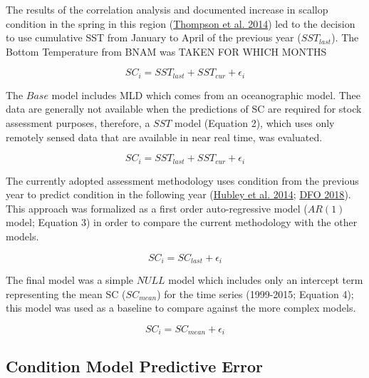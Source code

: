 \documentclass[
]{article}
\begin{document}
The results of the correlation analysis and documented increase in scallop condition in the spring in this region (\protect\hyperlink{ref-thompsonIdentifyingSpawningEvents2014}{Thompson et al. 2014}) led to the decision to use cumulative SST from January to April of the previous year (\(SST_{last}\)). The Bottom Temperature from BNAM was TAKEN FOR WHICH MONTHS

\begin{equation}  SC_{i} = SST_{last} + SST_{cur} + \epsilon_i    \end{equation}

The \(Base\) model includes MLD which comes from an oceanographic model. Thee data are generally not available when the predictions of SC are required for stock assessment purposes, therefore, a \(SST\) model (Equation 2), which uses only remotely sensed data that are available in near real time, was evaluated.

\begin{equation}  SC_{i} = SST_{last} + SST_{cur} + \epsilon_i    \end{equation}

The currently adopted assessment methodology uses condition from the previous year to predict condition in the following year (\protect\hyperlink{ref-hubleyGeorgesBankBrowns2014}{Hubley et al. 2014}; \protect\hyperlink{ref-dfoStockStatusUpdate2018}{DFO 2018}). This approach was formalized as a first order auto-regressive model (\(AR(1)\) model; Equation 3) in order to compare the current methodology with the other models.

\begin{equation} SC_{i} = SC_{last} + \epsilon_i    \end{equation}

The final model was a simple \(NULL\) model which includes only an intercept term representing the mean SC (\(SC_{mean}\)) for the time series (1999-2015; Equation 4); this model was used as a baseline to compare against the more complex models.

\begin{equation} SC_{i} =  SC_{mean} + \epsilon_i    \end{equation}

\hypertarget{condition-model-predictive-error}{%
\subsection{Condition Model Predictive Error}\label{condition-model-predictive-error}}
\end{document}

